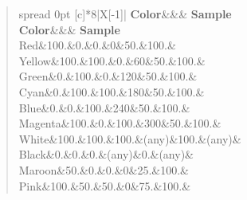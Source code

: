 \begin{DoxyDescription}
\begin{quote}
\tabulinesep=1mm
\begin{longtabu} spread 0pt [c]{*{8}{|X[-1]}|}
\hline
\rowcolor{\tableheadbgcolor}\textbf{ Color}&&&\textbf{ Sample }\\
\endfirsthead
\hline
\endfoot
\hline
\rowcolor{\tableheadbgcolor}\textbf{ Color}&&&\textbf{ Sample }\\
\endhead
Red&100.&0.&0.&0&50.&100.&~ \\
Yellow&100.&100.&0.&60&50.&100.&~ \\
Green&0.&100.&0.&120&50.&100.&~ \\
Cyan&0.&100.&100.&180&50.&100.&~ \\
Blue&0.&0.&100.&240&50.&100.&~ \\
Magenta&100.&0.&100.&300&50.&100.&~ \\
White&100.&100.&100.&(any)&100.&(any)&~ \\
Black&0.&0.&0.&(any)&0.&(any)&~ \\
Maroon&50.&0.&0.&0&25.&100.&~ \\
Pink&100.&50.&50.&0&75.&100.&~ \\
\end{longtabu}
\end{quote}



\end{DoxyDescription}\mbox{\label{namespacem__color_a76f00e1d418c4904a963094bc730a0e6}} 
